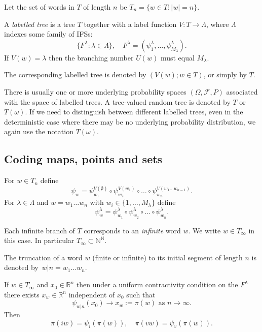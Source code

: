 \documentclass[a4paper]{amsart}
\theoremstyle{plain}
\theoremstyle{definition}
\theoremstyle{remark}
\begin{document}
Let the set of words in $ T $ of length $ n $ be
$ T_n = \{ w \in T : |w|=n \}$.

 

\medskip
A \emph{labelled tree}   is a tree $ T $ together with a  label function  $ V:T \to   \Lambda $, where $ \Lambda $ indexes some family of IFSs:  
\begin{equation} \label{} 
 \{ F^\lambda : \lambda \in \Lambda \} , \quad  F^\lambda  = (\psi^\lambda_1, \dots, \psi^\lambda_{M_\lambda }). 
\end{equation} 
   If $ V(w) = \lambda $ then the  branching number $ U(w) $  must  equal  $ M_\lambda $.
 
The corresponding labelled tree is denoted by $ (V(w) ; w \in T ) $, or simply by $ T $.

\medskip There is usually one or more underlying probability spaces $ (\Omega, \mathcal{F}, P) $ associated with the space of labelled trees.   A tree-valued random tree is  denoted by $ T $ or $ T(\omega) $. 
If we need to distinguish between different labelled trees, even in the deterministic case where there may be no underlying probability distribution, we again use the notation $ T(\omega) $.


\subsection{Coding maps, points and sets}
For $ w \in T_n $  define
\begin{equation} \label{}
 \psi_w   = \psi_{w_1}^{V(\emptyset)} \circ \psi_{w_2}^{V(w_1)}\circ \dots   \circ \psi_{w_n}^{V(w_1\dots w_{n-1})} .
\end{equation} 
For $ \lambda\in \Lambda $ and $ w = w_1\dots w_n $ with $ w_i \in \{1,\dots, M_\lambda \} $ define
\[  \psi_w^\lambda    = \psi_{w_1}^\lambda \circ \psi_{w_2}^{\lambda }\circ \dots   \circ \psi_{w_n}^{\lambda } .\]

Each infinite branch of $ T $ corresponds to an \emph{infinite} word $ w $.  We write $ w \in T_\infty $  in this case.  In particular $  T_\infty  \subset \mathbb{N} ^ \mathbb{N}  $. 

The truncation of a word $ w $ (finite or infinite) to its initial segment of length $ n $ is denoted by~$ w | n = w_1\dots w_n $.

If $ w \in T_\infty $ and $ x_0 \in \mathbb{R}^n $ then under a uniform contractivity condition on the  $ F^ \lambda $ there exists $ x_w \in \mathbb{R}^n $  independent of $ x_0 $ such that 
\begin{equation} \label{} 
\psi_{w|n}(x_0) \to x_w:= \pi(w) \text{ as } n \to \infty. 
\end{equation} 
Then
\begin{equation} \label{} 
\pi(iw) = \psi_i (\pi(w)), \quad        \pi(vw) = \psi_v (\pi(w))                   .
\end{equation} 
\end{document}
